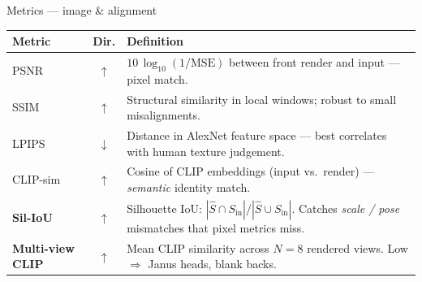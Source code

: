 \documentclass[aspectratio=169, 11pt]{beamer}
\newcommand{\arrup}{\textcolor{metup}{$\uparrow$}}
\newcommand{\arrdn}{\textcolor{metdn}{$\downarrow$}}
\begin{document}
\begin{frame}{Metrics — image \& alignment}
  \scriptsize
  \renewcommand{\arraystretch}{1.45}
  \begin{tabular}{@{}p{2.8cm}cp{8.6cm}@{}}
    \toprule
    \textbf{Metric} & \textbf{Dir.} & \textbf{Definition} \\
    \midrule
    PSNR & \arrup &
      $10\,\log_{10}(1/\mathrm{MSE})$ between front render and input — pixel match. \\
    SSIM & \arrup &
      Structural similarity in local windows; robust to small misalignments. \\
    LPIPS & \arrdn &
      Distance in AlexNet feature space — best correlates with human texture judgement. \\
    CLIP-sim & \arrup &
      Cosine of CLIP embeddings (input vs.\ render) — \emph{semantic} identity match. \\
    \textbf{Sil-IoU} & \arrup &
      Silhouette IoU: $|\hat S \cap S_{\text{in}}| / |\hat S \cup S_{\text{in}}|$.
      Catches \emph{scale / pose} mismatches that pixel metrics miss. \\
    \textbf{Multi-view CLIP} & \arrup &
      Mean CLIP similarity across $N{=}8$ rendered views. Low $\Rightarrow$ Janus heads, blank backs. \\
    \bottomrule
  \end{tabular}
\end{frame}
\end{document}
